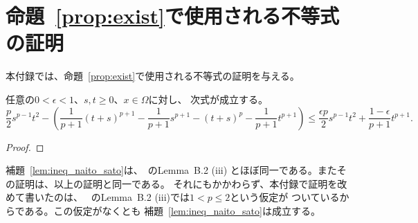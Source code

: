 
\section{命題~\ref{prop:exist}で使用される不等式の証明}

本付録では、命題~\ref{prop:exist}で使用される不等式の証明を与える。

\begin{lem} \label{lem:ineq_naito_sato}
 任意の$0 < \epsilon < 1$、$s, t \geq 0$、$x \in \Omega$に対し、
 次式が成立する。
 \begin{equation}
  \frac{p}{2}s^{p-1}t^2 - 
   \left( \frac{1}{p+1}(t+s)^{p+1} -
    \frac{1}{p+1}s^{p+1} - (t + s)^p - \frac{1}{p+1}t^{p+1}
   \right) \leq \frac{\epsilon p}{2} s^{p-1}
   t^2 + \frac{1-\epsilon}{p+1} t^{p+1}.
 \end{equation}
\end{lem}
 
\begin{proof}
 
\end{proof}

補題~\ref{lem:ineq_naito_sato}は、\cite{MR2886160}~のLemma~B.2 (iii)
とほぼ同一である。またその証明は、以上の証明と同一である。
それにもかかわらず、本付録で証明を改めて書いたのは、
\cite{MR2886160}~のLemma~B.2 (iii)では$1 < p \leq 2$という仮定が
ついているからである。この仮定がなくとも
補題~\ref{lem:ineq_naito_sato}は成立する。

